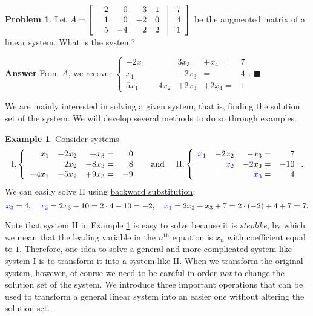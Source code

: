 \documentclass[12pt,letterpaper]{book}
\def\blue{\textcolor{blue}}
\numberwithin{equation}{section}
\theoremstyle{definition}
\newtheorem{problem}[thm]{\textbf{Problem}}
\newtheorem{example}[thm]{\textbf{Example}}
\newenvironment{answer}{\noindent\textbf{Answer}}{\hfill$\blacksquare$\vspace{0.1in}}
\begin{document}
\begin{problem}
Let $A=\displaystyle{\left[\begin{array}{rrrr@{\quad}|@{\quad}r} -2& 0 & 3 & 1 & 7 \\ 1& 0 & -2 & 0 & 4 \\ 5& -4 & 2 & 2 & 1 \end{array}\right]}$ be the augmented matrix of a linear system. What is the system?
\end{problem}

\begin{answer}
From $A$, we recover $\left\{\begin{array}{rrrrr}
-2x_1& &3x_3&+x_4=&7
\\ x_1&  &-2x_3 & =&4 \\ 5x_1&-4x_2&+2x_3&+2x_4=&1 \end{array}\right. .$
\end{answer}

We are mainly interested in solving a given system, that is, finding
the solution set of the system. We will develop several methods to
do so through examples.

\begin{example}\label{system I} Consider systems
$$\text{I.}\left\{\begin{array}{rrrr}
x_1&-2x_2&+x_3=&0
\\ &2x_2 &-8x_3=&8 \\ -4x_1&+5x_2&+9x_3=&-9 \end{array}\right. \quad \text{ and }\quad \text{II.}\left\{\begin{array}{rrrr}
\blue{x_1} &-2x_2&-x_3=&7
\\ &\blue{x_2} &-2x_3=&-10 \\ &&\blue{x_3}=&4 \end{array}\right. . $$
We can easily solve II using
\underline{backward substitution}:
$$\blue{x_3}=4,\quad \blue{x_2}=2x_3-10=2\cdot4-10=-2,\quad \blue{x_1}=2x_2+x_3+7=2\cdot(-2)+4+7=7.$$
\end{example}

Note that system II in Example \ref{system I} is easy to solve because it is \textit{steplike}, by which we mean that the leading variable in the $n^\text{th}$ equation is $x_n$ with coefficient equal to $1$. Therefore, one idea to solve a general and more complicated system like system I is to
transform it into a system like II. When we transform the
original system, however, of course we need to be careful in order \textit{not} to change the solution
set of the system. We introduce three important operations that can be used to transform a general linear system into an easier one without altering the solution set.
\end{document}

